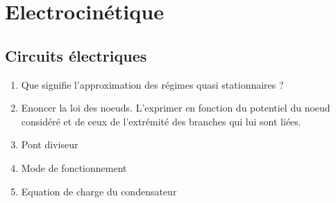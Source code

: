 \documentclass[a4paper,french,bookmarks]{article}
\begin{document}
    
    \section{Electrocinétique}
    
    \subsection{Circuits électriques}
    
    \begin{enumerate}
        \item Que signifie l'approximation des régimes quasi stationnaires ?
        
        
        \item Enoncer la loi des noeuds. L'exprimer en fonction du potentiel du noeud considéré et de ceux de l'extrémité des branches qui lui sont liées.
        
        
        \item Pont diviseur
        
        \boxans{
            \[ U_BC = \dfrac{R_2}{R_1 + R_2}E \]
        }
        
        \item Mode de fonctionnement
        
        \item Equation de charge du condensateur
        
    \end{enumerate}
    
\end{document}
